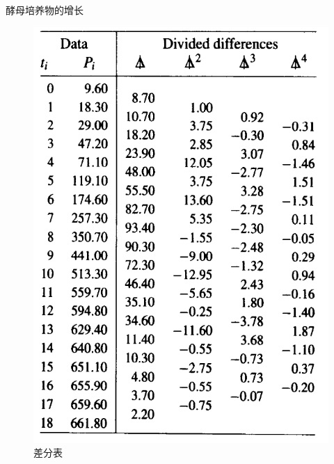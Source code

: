 \documentclass[UTF8]{ctexbeamer}
\begin{document}
\begin{frame}{酵母培养物的增长}

  \begin{figure}
    \centering{}
    \includegraphics[height=.7\textheight{}]{yeast-tab.png}
    \caption{差分表}
  \end{figure}
  
\end{frame}
\end{document}
